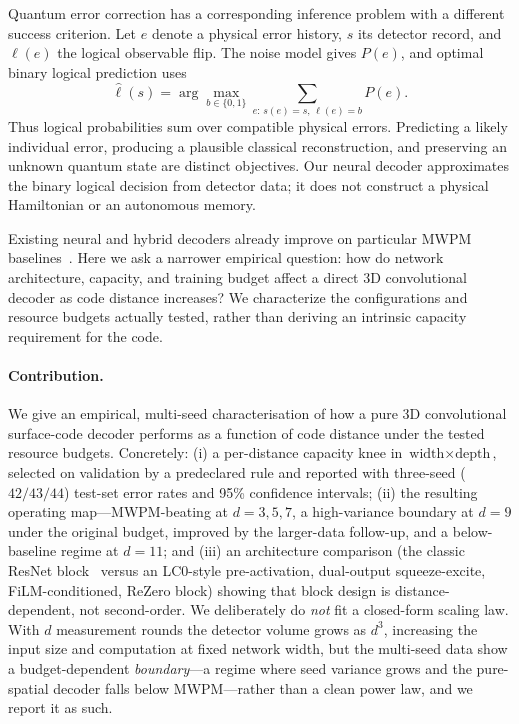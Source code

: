 \documentclass[11pt,a4paper]{article}
\begin{document}
Quantum error correction has a corresponding inference problem with a
different success criterion. Let $e$ denote a physical error history,
$s$ its detector record, and $\ell(e)$ the logical observable flip.
The noise model gives $P(e)$, and optimal binary logical prediction uses
\[
 \hat\ell(s)=\arg\max_{b\in\{0,1\}}
 \sum_{e:\,s(e)=s,\,\ell(e)=b} P(e).
\]
Thus logical probabilities sum over compatible physical errors. Predicting
a likely individual error, producing a plausible classical reconstruction,
and preserving an unknown quantum state are distinct objectives.
Our neural decoder approximates the binary logical decision from detector
data; it does not construct a physical Hamiltonian or an autonomous memory.

Existing neural and hybrid decoders already improve on particular MWPM
baselines~\cite{bausch2024alphaqubit,lange2025gnn,lee2025mamba,peled2026nmwpm}.
Here we ask a narrower empirical question: how do network architecture,
capacity, and training budget affect a direct 3D convolutional decoder
as code distance increases? We characterize the configurations and
resource budgets actually tested, rather than deriving an intrinsic
capacity requirement for the code.

\paragraph{Contribution.}
We give an empirical, multi-seed characterisation of how a pure 3D
convolutional surface-code decoder performs as a function of
code distance under the tested resource budgets. Concretely:
(i) a per-distance capacity knee in $\textrm{width}\times\textrm{depth}$,
selected on validation by a predeclared rule and reported with three-seed
($42/43/44$) test-set error rates and 95\% confidence intervals; (ii) the
resulting operating map---MWPM-beating at $d=3,5,7$, a high-variance
boundary at $d=9$ under the original budget, improved by the larger-data
follow-up, and a below-baseline regime at $d=11$; and (iii) an
architecture comparison (the classic ResNet block~\cite{he2016resnet}
versus an LC0-style pre-activation, dual-output squeeze-excite,
FiLM-conditioned, ReZero block) showing that block design is
distance-dependent, not second-order. We deliberately do \emph{not} fit a
closed-form scaling law. With $d$ measurement rounds the detector volume grows as $d^{3}$,
increasing the input size and computation at fixed network width, but the multi-seed data
show a budget-dependent \emph{boundary}---a regime where seed variance grows and
the pure-spatial decoder falls below MWPM---rather than a clean power law,
and we report it as such.
\end{document}
